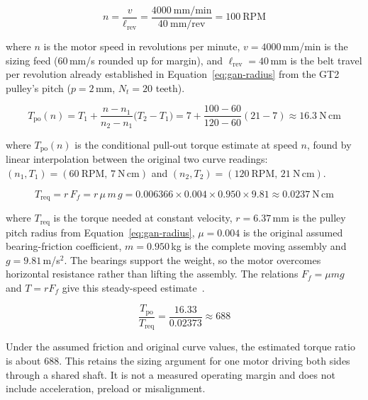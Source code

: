 \begin{equation}
n = \frac{v}{\ell_{\mathrm{rev}}} = \frac{4000\ \mathrm{mm/min}}{40\ \mathrm{mm/rev}} = 100\ \mathrm{RPM}
\label{eq:gan-rpm}
\end{equation}

where $n$ is the motor speed in revolutions per minute, $v=4000$\,mm/min is the sizing feed (60\,mm/s rounded up for margin), and $\ell_{\mathrm{rev}}=40$\,mm is the belt travel per revolution already established in Equation~\ref{eq:gan-radius} from the GT2 pulley's pitch ($p=2$\,mm, $N_t=20$ teeth).

\begin{equation}
T_{\mathrm{po}}(n) = T_1 + \frac{n-n_1}{n_2-n_1}\bigl(T_2-T_1\bigr) = 7 + \frac{100-60}{120-60}(21-7) \approx 16.3\ \mathrm{N\,cm}
\label{eq:gan-pullout}
\end{equation}

where $T_{\mathrm{po}}(n)$ is the conditional pull-out torque estimate at speed $n$, found by linear interpolation between the original two curve readings: $(n_1,T_1)=(60\ \mathrm{RPM},\,7\ \mathrm{N\,cm})$ and $(n_2,T_2)=(120\ \mathrm{RPM},\,21\ \mathrm{N\,cm})$. 

\begin{equation}
T_{\mathrm{req}} = r\,F_f = r\,\mu\,m\,g = 0.006366 \times 0.004 \times 0.950 \times 9.81 \approx 0.0237\ \mathrm{N\,cm}
\label{eq:gan-treq}\label{eq:des-torque}
\end{equation}

where $T_{\mathrm{req}}$ is the torque needed at constant velocity, $r=6.37$\,mm is the pulley pitch radius from Equation~\ref{eq:gan-radius}, $\mu=0.004$ is the original assumed bearing-friction coefficient, $m=0.950$\,kg is the complete moving assembly and $g=9.81$\,m/s$^2$. The bearings support the weight, so the motor overcomes horizontal resistance rather than lifting the assembly. The relations $F_f=\mu mg$ and $T=rF_f$ give this steady-speed estimate~\cite{acarnley2002}.

\begin{equation}
\frac{T_{\mathrm{po}}}{T_{\mathrm{req}}} = \frac{16.33}{0.02373} \approx 688
\label{eq:gan-margin}
\end{equation}

Under the assumed friction and original curve values, the estimated torque ratio is about 688. This retains the sizing argument for one motor driving both sides through a shared shaft. It is not a measured operating margin and does not include acceleration, preload or misalignment.

